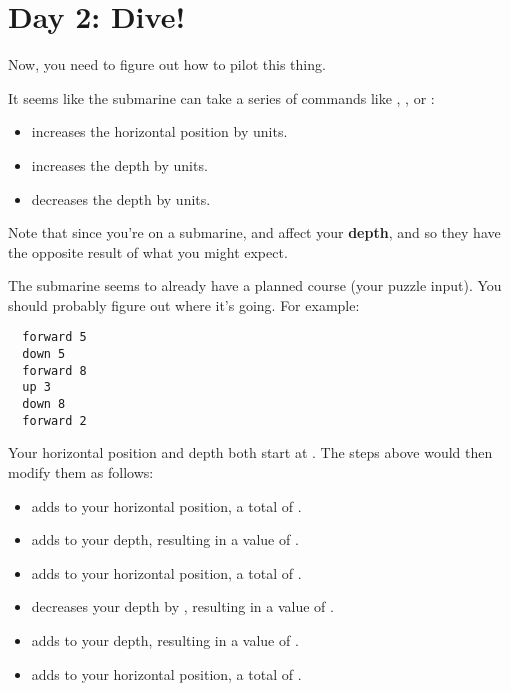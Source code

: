 \newpage%
\section{Day 2: Dive!}

Now, you need to figure out how to pilot this thing.

It seems like the submarine can take a series of commands like {\Tt{}\nwendquote}, {\Tt{}\nwendquote}, or {\Tt{}\nwendquote}:
\begin{itemize}
\item {\Tt{}\nwendquote} increases the horizontal position by  units.
\item {\Tt{}\nwendquote} increases the depth by  units.
\item {\Tt{}\nwendquote} decreases the depth by  units.
\end{itemize}

Note that since you're on a submarine, {\Tt{}\nwendquote} and {\Tt{}\nwendquote} affect your \textbf{depth}, and so they have the opposite result of what you might expect.

The submarine seems to already have a planned course (your puzzle input). You should probably figure out where it's going. For example:
\begin{verbatim}
  forward 5
  down 5
  forward 8
  up 3
  down 8
  forward 2
\end{verbatim}

Your horizontal position and depth both start at . The steps above would then modify them as follows:
\begin{itemize}
  \item {\Tt{}\nwendquote} adds  to your horizontal position, a total of .
  \item {\Tt{}\nwendquote} adds  to your depth, resulting in a value of .
  \item {\Tt{}\nwendquote} adds  to your horizontal position, a total of .
  \item {\Tt{}\nwendquote} decreases your depth by , resulting in a value of .
  \item {\Tt{}\nwendquote} adds  to your depth, resulting in a value of .
  \item {\Tt{}\nwendquote} adds  to your horizontal position, a total of .
\end{itemize}

